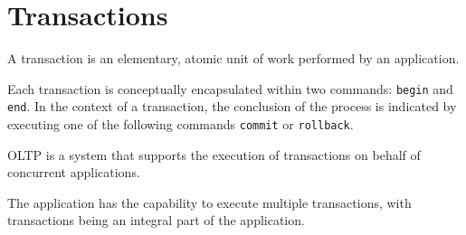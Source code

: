 \section{Transactions}

\begin{definition}
    A transaction is an elementary, atomic unit of work performed by an application. 
\end{definition}
Each transaction is conceptually encapsulated within two commands: \texttt{begin} and \texttt{end}. 
In the context of a transaction, the conclusion of the process is indicated by executing one of the following commands \texttt{commit} or \texttt{rollback}.
\begin{definition}
    OLTP is a system that supports the execution of transactions on behalf of concurrent applications. 
\end{definition}
The application has the capability to execute multiple transactions, with transactions being an integral part of the application. 

